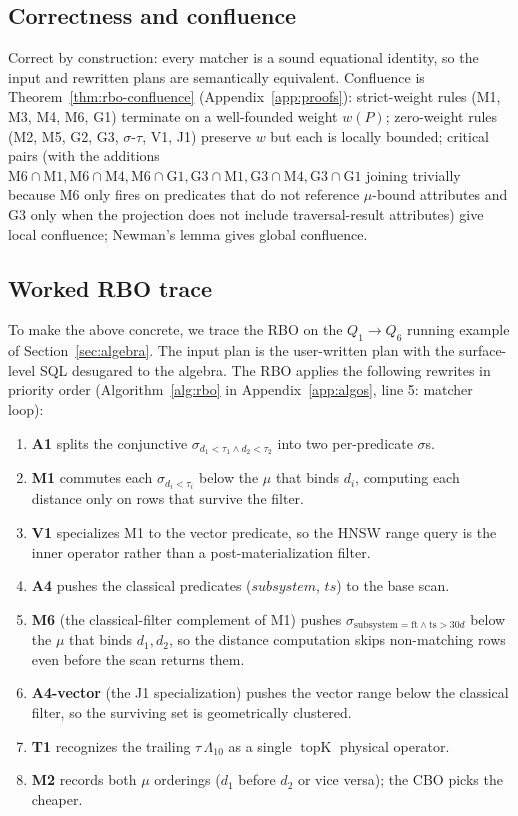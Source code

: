 \documentclass[sigconf]{acmart}
\theoremstyle{plain}
\theoremstyle{definition}
\newcommand{\topK}{\operatorname{topK}}
\theoremstyle{remark}
\begin{document}
\subsection{Correctness and confluence}

Correct by construction: every matcher is a sound equational
identity, so the input and rewritten plans are semantically
equivalent. Confluence is Theorem~\ref{thm:rbo-confluence}
(Appendix~\ref{app:proofs}): strict-weight rules (M1, M3, M4,
M6, G1) terminate on a well-founded weight $w(P)$; zero-weight
rules (M2, M5, G2, G3, $\sigma$-$\tau$, V1, J1) preserve $w$ but
each is locally bounded; critical pairs (with the additions
$\mathrm{M6\cap M1}, \mathrm{M6\cap M4}, \mathrm{M6\cap G1},
\mathrm{G3\cap M1}, \mathrm{G3\cap M4}, \mathrm{G3\cap G1}$
joining trivially because M6 only fires on predicates that do
not reference $\mu$-bound attributes and G3 only when the
projection does not include traversal-result attributes) give
local confluence; Newman's lemma gives global confluence.
\subsection{Worked RBO trace}\label{sec:rbo:trace}

To make the above concrete, we trace the RBO on the
$Q_1 \to Q_6$ running example of
Section~\ref{sec:algebra}. The input plan is the
user-written plan with the surface-level SQL desugared to the
algebra. The RBO applies the following rewrites in priority
order (Algorithm~\ref{alg:rbo} in
Appendix~\ref{app:algos}, line 5: matcher loop):

\begin{enumerate}[leftmargin=*, itemsep=0pt]
  \item \textbf{A1} splits the conjunctive
    $\sigma_{d_1<\tau_1 \wedge d_2<\tau_2}$ into two
    per-predicate $\sigma$s.
  \item \textbf{M1} commutes each $\sigma_{d_i<\tau_i}$ below the
    $\mu$ that binds $d_i$, computing each distance only on
    rows that survive the filter.
  \item \textbf{V1} specializes M1 to the vector predicate, so
    the HNSW range query is the inner operator rather than a
    post-materialization filter.
  \item \textbf{A4} pushes the classical predicates
    ($\mathit{subsystem}$, $\mathit{ts}$) to the base scan.
  \item \textbf{M6} (the classical-filter complement of M1) pushes
    $\sigma_{\mathrm{subsystem}=\mathrm{ft} \wedge \mathrm{ts}>30d}$
    below the $\mu$ that binds $d_1, d_2$, so the distance
    computation skips non-matching rows even before the scan
    returns them.
  \item \textbf{A4-vector} (the J1 specialization) pushes the
    vector range below the classical filter, so the surviving
    set is geometrically clustered.
  \item \textbf{T1} recognizes the trailing $\tau\,\Lambda_{10}$
    as a single $\topK$ physical operator.
  \item \textbf{M2} records both $\mu$ orderings
    ($d_1$ before $d_2$ or vice versa); the CBO picks the
    cheaper.
\end{enumerate}
\end{document}
